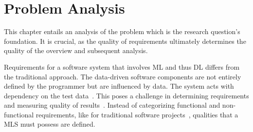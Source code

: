 \chapter{Problem Analysis}\label{ch:problem}
This chapter entails an analysis of the problem which is the research question's foundation.
It is crucial, as the quality of requirements ultimately determines the quality of the overview and
subsequent analysis.

Requirements for a software system that involves \ac{ML} and thus \ac{DL} differs from
the traditional approach. The data-driven software components are not entirely defined by the
programmer but are influenced by data.
The system acts with dependency on the test data~\citep{siebert_construction_2021}.
This poses a challenge in determining requirements and measuring quality of
results~\citep{nakamichi_requirements-driven_2020}.
Instead of categorizing functional and non-functional requirements, like for traditional
software projects~\citep{zowghi_requirements_2014}, qualities that a \ac{MLS} must possess
are defined.


